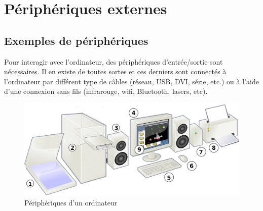 \documentclass[11pt, a4paper]{book}
\begin{document}
\section{Périphériques externes}

\subsection{Exemples de périphériques}

Pour interagir avec l’ordinateur, des périphériques d’entrée/sortie sont nécessaires. Il en existe de toutes sortes et ces derniers sont connectés à l’ordinateur par différent type de câbles (réseau, USB, DVI, série, etc.) ou à l’aide d’une connexion sans fils (infrarouge, wifi, Bluetooth, lasers, etc).

\begin{figure}[h]
	\centering
	\includegraphics[scale=.3]{images/peripherique}
	\caption{Périphériques d'un ordinateur}
\end{figure}
\end{document}
